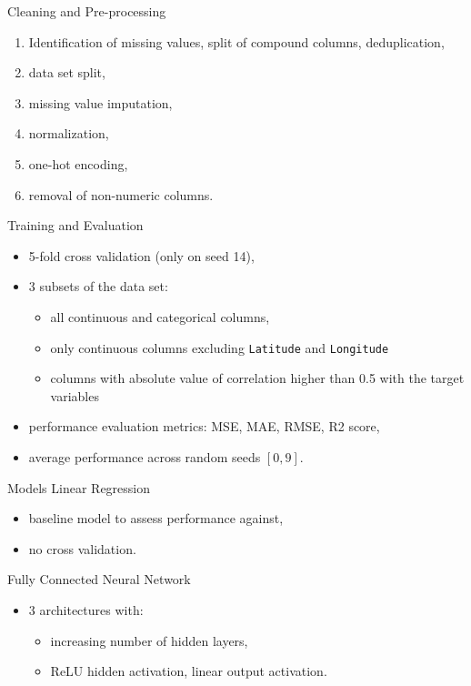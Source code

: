 \documentclass{beamer} %
\begin{document}
\begin{frame}{Cleaning and Pre-processing}
  \vspace{-1cm}
  \begin{enumerate}
      \item Identification of missing values, split of compound columns, deduplication,
      \item data set split,
      \item missing value imputation,
      \item normalization,
      \item one-hot encoding,
      \item removal of non-numeric columns.
  \end{enumerate}
\end{frame}

\begin{frame}{Training and Evaluation}
  \vspace{-1cm}
  \begin{itemize}
      \item 5-fold cross validation (only on seed 14),
      \item 3 subsets of the data set:
        \begin{itemize}
            \item all continuous and categorical columns,
            \item only continuous columns excluding \texttt{Latitude} and \texttt{Longitude}
            \item columns with absolute value of correlation higher than 0.5 with the target variables
        \end{itemize}
      \item performance evaluation metrics: MSE, MAE, RMSE, R2 score,
      \item average performance across random seeds $[0, 9]$.
  \end{itemize}
\end{frame}

\begin{frame}{Models}
  \vspace{-0.5cm}
  Linear Regression
  \begin{itemize}
      \item baseline model to assess performance against,
      \item no cross validation.
  \end{itemize}
  Fully Connected Neural Network
  \begin{itemize}
      \item 3 architectures with:
        \begin{itemize}
            \item increasing number of hidden layers,
            \item ReLU hidden activation, linear output activation.
        \end{itemize}
  \end{itemize}
\end{frame}
\end{document}
